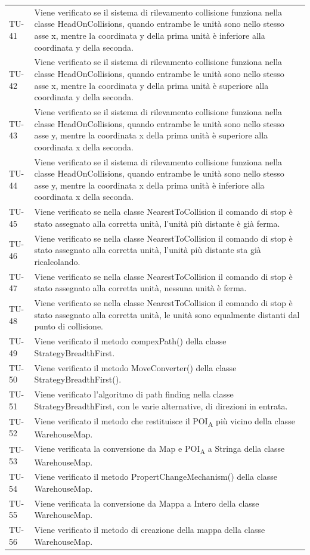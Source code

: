 \begin{longtable}{ >{\centering}p{} >{}p{}}
	TU-41 & Viene verificato se il sistema di rilevamento collisione funziona nella classe HeadOnCollisions, quando entrambe le unità sono nello stesso asse x, mentre la coordinata y della prima unità è inferiore alla coordinata y della seconda. \tabularnewline
	TU-42 & Viene verificato se il sistema di rilevamento collisione funziona nella classe HeadOnCollisions, quando entrambe le unità sono nello stesso asse x, mentre la coordinata y della prima unità è superiore alla coordinata y della seconda. \tabularnewline
	TU-43 & Viene verificato se il sistema di rilevamento collisione funziona nella classe HeadOnCollisions, quando entrambe le unità sono nello stesso asse y, mentre la coordinata x della prima unità è superiore alla coordinata x della seconda. \tabularnewline
	TU-44 & Viene verificato se il sistema di rilevamento collisione funziona nella classe HeadOnCollisions, quando entrambe le unità sono nello stesso asse y, mentre la coordinata x della prima unità è inferiore alla coordinata x della seconda. \tabularnewline
	TU-45 & Viene verificato se nella classe NearestToCollision il comando di stop è stato assegnato alla corretta unità, l'unità più distante è già ferma. \tabularnewline
	TU-46 & Viene verificato se nella classe NearestToCollision il comando di stop è stato assegnato alla corretta unità, l'unità più distante sta già ricalcolando. \tabularnewline
	TU-47 & Viene verificato se nella classe NearestToCollision il comando di stop è stato assegnato alla corretta unità, nessuna unità è ferma. \tabularnewline
	TU-48 & Viene verificato se nella classe NearestToCollision il comando di stop è stato assegnato alla corretta unità, le unità sono equalmente distanti dal punto di collisione. \tabularnewline
	TU-49 & Viene verificato il metodo compexPath() della classe StrategyBreadthFirst. \tabularnewline
	TU-50 & Viene verificato il metodo MoveConverter() della classe StrategyBreadthFirst(). \tabularnewline
	TU-51 & Viene verificato l'algoritmo di path finding nella classe StrategyBreadthFirst, con le varie alternative, di direzioni in entrata. \tabularnewline
	TU-52 & Viene verificato il metodo che restituisce il POI\textsubscript{A} più vicino della classe WarehouseMap. \tabularnewline
	TU-53 & Viene verificata la conversione da Map e POI\textsubscript{A} a Stringa della classe WarehouseMap. \tabularnewline
	TU-54 & Viene verificato il metodo PropertChangeMechanism() della classe WarehouseMap. \tabularnewline
	TU-55 & Viene verificata la conversione da Mappa a Intero della classe WarehouseMap. \tabularnewline
	TU-56 & Viene verificato il metodo di creazione della mappa della classe WarehouseMap. \tabularnewline

\end{longtable}
